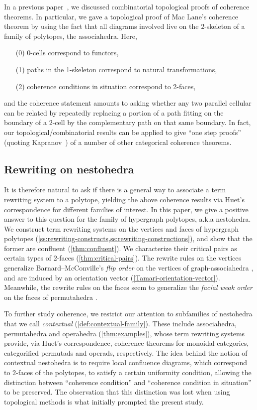 In a previous paper~\cite{CLA1}, we discussed combinatorial topological proofs of coherence theorems.
In particular, we gave a topological proof of Mac Lane's coherence theorem by using the fact that all diagrams involved live on the $2$-skeleton of a family of polytopes, the associahedra. 
Here, 
\begin{itemize}
\item[(0)] 0-cells correspond to functors, 
\item[(1)] paths in the 1-skeleton correspond to natural transformations,  
\item[(2)] coherence conditions in situation correspond to 2-faces,  
\end{itemize}
and the coherence statement amounts to asking whether any two parallel cellular can be related by repeatedly replacing a portion of a path fitting on the boundary of a $2$-cell by the complementary path on that same boundary.
In fact, our topological/combinatorial results can be applied to give ``one step proofs'' (quoting Kapranov~\cite{kapranov1993}) of a number of other categorical coherence theorems. 

\subsection*{Rewriting on nestohedra}

It is therefore natural to ask if there is a general way to associate a term rewriting system to a polytope, yielding the above coherence results via Huet's correspondence for different families of interest. 
In this paper, we give a positive answer to this question for the family of hypergraph polytopes, a.k.a nestohedra. 
We construct term rewriting systems on the vertices and faces of hypergraph polytopes (\cref{ss:rewriting-constructs,ss:rewriting-constructions}), and show that the former are confluent (\cref{thm:confluent}). 
We characterize their critical pairs as certain types of $2$-faces (\cref{thm:critical-pairs}).
The rewrite rules on the vertices generalize Barnard--McConville's \emph{flip order} on the vertices of graph-associahedra \cite{Barnard-McConville}, and are induced by an orientation vector (\cref{Tamari-orientation-vector}).
Meanwhile, the rewrite rules on the faces seem to generalize the \emph{facial weak order} on the faces of permutahedra \cite{KrobLatapyNovelliPhanSchwer,PalaciosRonco,DermenjianHohlwegPilaud}.

To further study coherence, we restrict our attention to subfamilies of nestohedra that we call \emph{contextual} (\cref{def:contextual-family}).
These include associahedra, permutahedra and operahedra (\cref{thm:examples}), whose term rewriting systems provide, via Huet's correspondence, coherence theorems for monoidal categories, categorified permutads and operads, respectively. 
The idea behind the notion of contextual nestohedra is to require local confluence diagrams, which correspond to $2$-faces of the polytopes, to satisfy a certain uniformity condition, allowing the distinction between ``coherence condition'' and ``coherence condition in situation'' to be preserved.
The observation that this distinction was lost when using topological methods \cite{CLA1} is what initially prompted the present study.  


